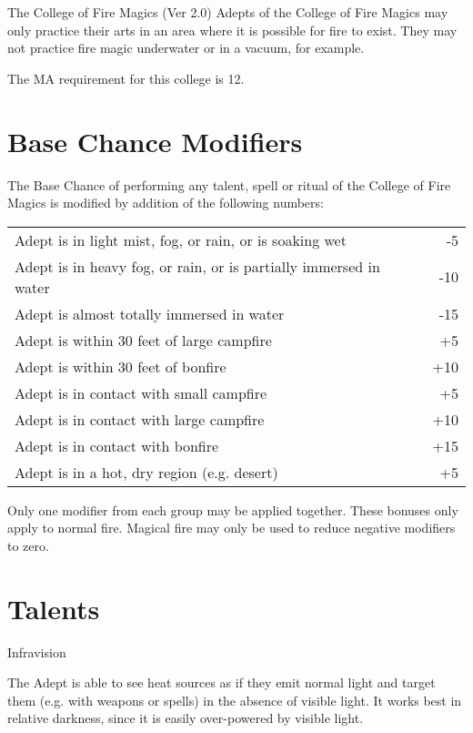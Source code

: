 \begin{Chapter}{The College of Fire Magics (Ver 2.0)}
Adepts of the College of Fire Magics may only practice their arts in
an area where it is possible for fire to exist.  They may not practice
fire magic underwater or in a vacuum, for example.

The MA requirement for this college is 12. 

\section{Base Chance Modifiers}

The Base Chance of performing any talent, spell or ritual of the
College of Fire Magics is modified by addition of the following
numbers:

\begin{tabularx}{\linewidth}{Xr}
Adept is in light mist, fog, or rain, or is soaking wet & -5 \\
Adept is in heavy fog, or rain, or is partially immersed in water & -10 \\
Adept is almost totally immersed in water & -15 \\
Adept is within 30 feet of large campfire & +5 \\
Adept is within 30 feet of bonfire  & +10 \\
Adept is in contact with small campfire & +5 \\
Adept is in contact with large campfire  & +10 \\
Adept is in contact with bonfire  & +15 \\
Adept is in a hot, dry region (e.g. desert) & +5 \\
\end{tabularx}

Only one modifier from each group may be applied together. These
bonuses only apply to normal fire.  Magical fire may only be used to
reduce negative modifiers to zero.

\section{Talents}

\begin{talent}[T-1]{Infravision}

\begin{effects}
The Adept is able to see heat sources as if they emit normal light and
target them (e.g.  with weapons or spells) in the absence of visible
light. It works best in relative darkness, since it is easily
over-powered by visible light.


\end{effects}
\end{talent}
\end{Chapter}
